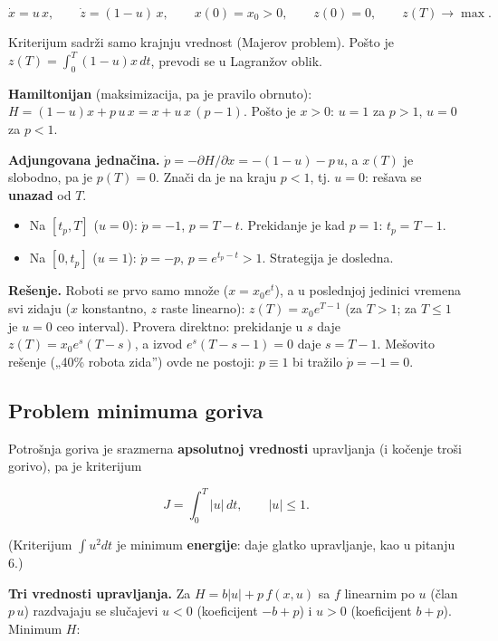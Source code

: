 \documentclass[11pt,a4paper,parskip=half,headsepline,numbers=noenddot]{scrartcl}
\begin{document}
\[\dot x = u\,x, \qquad \dot z = (1 - u)\,x, \qquad x(0) = x_0 > 0, \qquad z(0) = 0, \qquad z(T) \to \max .\]

Kriterijum sadrži samo krajnju vrednost (Majerov problem). Pošto je \(z(T) = \int_0^T(1 - u)x\,dt\), prevodi se u Lagranžov oblik.

\textbf{Hamiltonijan} (maksimizacija, pa je pravilo obrnuto): \(H = (1 - u)x + p\,u\,x = x + u\,x\,(p - 1)\). Pošto je \(x > 0\): \(u = 1\) za \(p > 1\), \(u = 0\) za \(p < 1\).

\textbf{Adjungovana jednačina.} \(\dot p = -\partial H/\partial x = -(1 - u) - p\,u\), a \(x(T)\) je slobodno, pa je \(p(T) = 0\). Znači da je na kraju \(p < 1\), tj. \(u = 0\): rešava se \textbf{unazad} od \(T\).

\begin{itemize}
\item Na \([t_p, T]\) (\(u = 0\)): \(\dot p = -1\), \(p = T - t\). Prekidanje je kad \(p = 1\): \(t_p = T - 1\).
\item Na \([0, t_p]\) (\(u = 1\)): \(\dot p = -p\), \(p = e^{t_p - t} > 1\). Strategija je dosledna.
\end{itemize}

\textbf{Rešenje.} Roboti se prvo samo množe (\(x = x_0e^t\)), a u poslednjoj jedinici vremena svi zidaju (\(x\) konstantno, \(z\) raste linearno): \(z(T) = x_0e^{T - 1}\) (za \(T > 1\); za \(T \le 1\) je \(u = 0\) ceo interval). Provera direktno: prekidanje u \(s\) daje \(z(T) = x_0e^s(T - s)\), a izvod \(e^s(T - s - 1) = 0\) daje \(s = T - 1\). Mešovito rešenje („40\% robota zida'') ovde ne postoji: \(p \equiv 1\) bi tražilo \(\dot p = -1 = 0\).

\subsection{Problem minimuma goriva}

Potrošnja goriva je srazmerna \textbf{apsolutnoj vrednosti} upravljanja (i kočenje troši gorivo), pa je kriterijum

\[J = \int_0^T|u|\,dt, \qquad |u| \le 1 .\]

(Kriterijum \(\int u^2dt\) je minimum \textbf{energije}: daje glatko upravljanje, kao u pitanju 6.)

\textbf{Tri vrednosti upravljanja.} Za \(H = b|u| + p\,f(x, u)\) sa \(f\) linearnim po \(u\) (član \(p\,u\)) razdvajaju se slučajevi \(u < 0\) (koeficijent \(-b + p\)) i \(u > 0\) (koeficijent \(b + p\)). Minimum \(H\):
\end{document}
